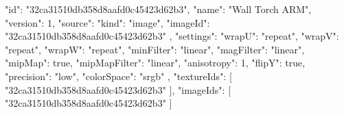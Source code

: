 {
  "id": "32ca31510db358d8aafd0c45423d62b3",
  "name": "Wall Torch ARM",
  "version": 1,
  "source": {
    "kind": "image",
    "imageId": "32ca31510db358d8aafd0c45423d62b3"
  },
  "settings": {
    "wrapU": "repeat",
    "wrapV": "repeat",
    "wrapW": "repeat",
    "minFilter": "linear",
    "magFilter": "linear",
    "mipMap": true,
    "mipMapFilter": "linear",
    "anisotropy": 1,
    "flipY": true,
    "precision": "low",
    "colorSpace": "srgb"
  },
  "textureIds": [
    "32ca31510db358d8aafd0c45423d62b3"
  ],
  "imageIds": [
    "32ca31510db358d8aafd0c45423d62b3"
  ]
}
